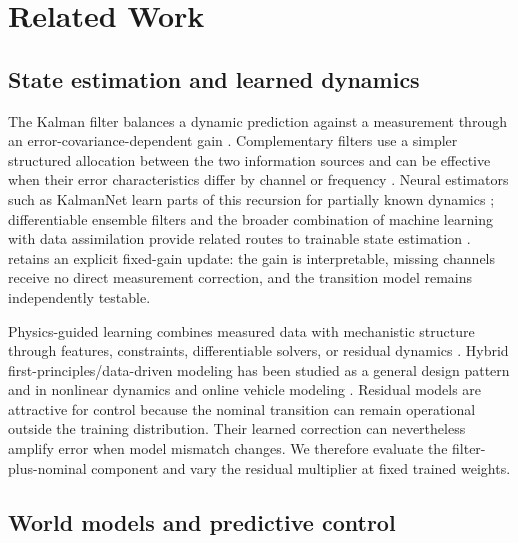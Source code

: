 \section{Related Work}

\subsection{State estimation and learned dynamics}

The Kalman filter balances a dynamic prediction against a measurement through
an error-covariance-dependent gain \cite{kalman1960_filtering}. Complementary
filters use a simpler structured allocation between the two information
sources and can be effective when their error characteristics differ by
channel or frequency \cite{mahony2008_complementary}. Neural estimators such as
KalmanNet learn parts of this recursion for partially known dynamics
\cite{revach2022_kalmannet}; differentiable ensemble filters and the broader
combination of machine learning with data assimilation provide related routes
to trainable state estimation
\cite{chen2022_autodifferentiable_enkf,cheng2023_machine_learning_with_data_assimilation}.
\method{} retains an explicit fixed-gain update: the gain is interpretable,
missing channels receive no direct measurement correction, and the transition
model remains independently testable.

Physics-guided learning combines measured data with mechanistic structure
through features, constraints, differentiable solvers, or residual dynamics
\cite{willard2022_integrating_scientific_knowledge_with_machine,liu2022_physics_guided_deep_markov_models}.
Hybrid first-principles/data-driven modeling has been studied as a general
design pattern and in nonlinear dynamics and online vehicle modeling
\cite{bradley2022_perspectives_on_the_integration_between,robinson2022_physics_guided_neural_networks_for,chen2022_hybrid_physics_data_driven_online}.
Residual models are attractive for control because the nominal transition can
remain operational outside the training distribution. Their learned correction
can nevertheless amplify error when model mismatch changes. We therefore
evaluate the filter-plus-nominal component and vary the residual multiplier at
fixed trained weights.

\subsection{World models and predictive control}

